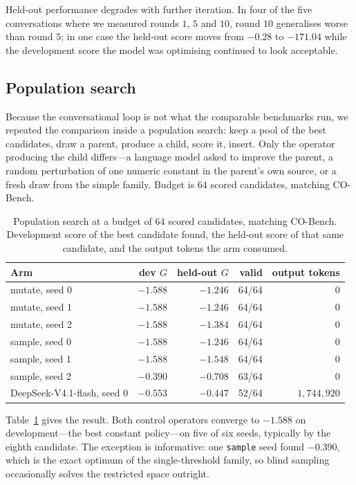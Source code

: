 \documentclass[conference]{IEEEtran}
\newcommand{\G}{\ensuremath{G}}
\begin{document}
Held-out performance degrades with further iteration. In four of the five conversations
where we measured rounds $1$, $5$ and $10$, round $10$ generalises worse than round $5$;
in one case the held-out score moves from $-0.28$ to $-171.04$ while the development score
the model was optimising continued to look acceptable.

\subsection{Population search}

Because the conversational loop is not what the comparable benchmarks run, we repeated the
comparison inside a population search: keep a pool of the best candidates, draw a parent,
produce a child, score it, insert. Only the operator producing the child differs---a
language model asked to improve the parent, a random perturbation of one numeric constant
in the parent's own source, or a fresh draw from the simple family. Budget is $64$ scored
candidates, matching CO-Bench.

\begin{table}[t]
\caption{Population search at a budget of $64$ scored candidates, matching CO-Bench.
Development score of the best candidate found, the held-out score of that same candidate,
and the output tokens the arm consumed.}
\label{tab:evolve}
\centering
\begin{tabular}{lrrrr}
\toprule
Arm & dev \G & held-out \G & valid & output tokens \\
\midrule
mutate, seed 0 & $-1.588$ & $-1.246$ & 64/64 & $0$ \\
mutate, seed 1 & $-1.588$ & $-1.246$ & 64/64 & $0$ \\
mutate, seed 2 & $-1.588$ & $-1.384$ & 64/64 & $0$ \\
sample, seed 0 & $-1.588$ & $-1.246$ & 64/64 & $0$ \\
sample, seed 1 & $-1.588$ & $-1.548$ & 64/64 & $0$ \\
sample, seed 2 & $\mathbf{-0.390}$ & $-0.708$ & 63/64 & $0$ \\
\midrule
DeepSeek-V4.1-flash, seed 0 & $-0.553$ & $-0.447$ & 52/64 & $1{,}744{,}920$ \\
\bottomrule
\end{tabular}
\end{table}

Table~\ref{tab:evolve} gives the result. Both control operators converge to $-1.588$ on
development---the best constant policy---on five of six seeds, typically by the eighth
candidate. The exception is informative: one \texttt{sample} seed found $-0.390$, which is
the exact optimum of the single-threshold family, so blind sampling occasionally solves
the restricted space outright.
\end{document}
